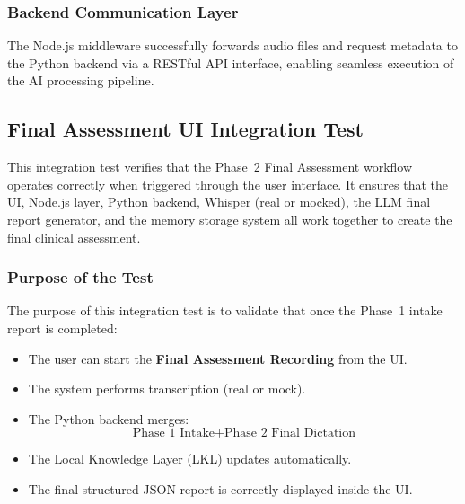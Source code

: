 


\subsubsection*{Backend Communication Layer}

The Node.js middleware successfully forwards audio files and request metadata to the Python backend via a RESTful API interface, enabling seamless execution of the AI processing pipeline.


\subsection{Final Assessment UI Integration Test}
\label{sec:testing:final-assessment-ui}

This integration test verifies that the Phase~2 \textendash{} Final Assessment workflow operates correctly when triggered through the user interface. It ensures that the UI, Node.js layer, Python backend, Whisper (real or mocked), the LLM final report generator, and the memory storage system all work together to create the final clinical assessment.

\subsubsection*{Purpose of the Test}
The purpose of this integration test is to validate that once the Phase~1 intake report is completed:
\begin{itemize}
    \item The user can start the \textbf{Final Assessment Recording} from the UI.
    \item The system performs transcription (real or mock).
    \item The Python backend merges:
    \[
    \text{Phase 1 Intake} + \text{Phase 2 Final Dictation}
    \]
    \item The Local Knowledge Layer (LKL) updates automatically.
    \item The final structured JSON report is correctly displayed inside the UI.
\end{itemize}



